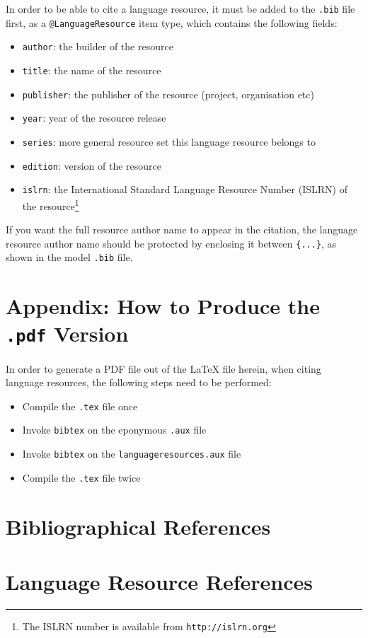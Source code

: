 \documentclass[10pt, a4paper]{article}
\begin{document}
In order to be able to cite a language resource, it must be added to
the \texttt{.bib} file first, as a \texttt{@LanguageResource} item type, which
contains the following fields:

\begin{itemize}
    \item{\texttt{author}: the builder of the resource}
    \item{\texttt{title}: the name of the resource}
    \item{\texttt{publisher}: the publisher of the resource (project,
          organisation etc)}
    \item{\texttt{year}: year of the resource release}
    \item{\texttt{series}: more general resource set this language resource
          belongs to}
    \item{\texttt{edition}: version of the resource}
    \item{\texttt{islrn}: the International Standard Language Resource Number
          (ISLRN) of the resource\footnote{The ISLRN number is available from
          \texttt{http://islrn.org}}} 
\end{itemize}

If you want the full resource author name to appear in the citation, the
language resource author name should be protected by enclosing it between
\texttt{\{...\}}, as shown in the model \texttt{.bib} file.

\vspace{.3\baselineskip}

\section*{Appendix: How to Produce the \texttt{.pdf} Version}

In order to generate a PDF file out of the LaTeX file herein, when citing
language resources, the following steps need to be performed:

\begin{itemize}
    \item{Compile the \texttt{.tex} file once}
    \item{Invoke \texttt{bibtex} on the eponymous \texttt{.aux} file}
    \item{Invoke \texttt{bibtex} on the \texttt{languageresources.aux} file}
    \item{Compile the \texttt{.tex} file twice}
\end{itemize}

\section{Bibliographical References}
\label{main:ref}





\section{Language Resource References}
\label{lr:ref}
\end{document}
